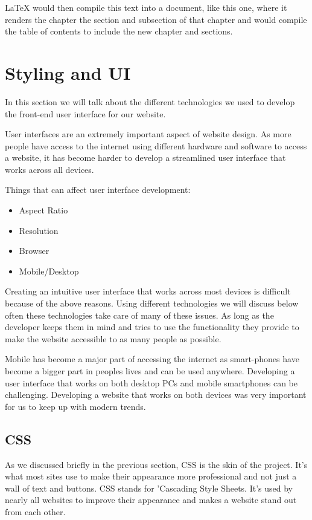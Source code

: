 LaTeX would then compile this text into a document, like this one, where it renders the chapter the section and subsection of that chapter and would compile the table of contents to include the new chapter and sections.

\section{Styling and UI}
In this section we will talk about the different technologies we used to develop the front-end user interface for our website. 

User interfaces are an extremely important aspect of website design. As more people have access to the internet using different hardware and software to access a website, it has become harder to develop a streamlined user interface that works across all devices. 

Things that can affect user interface development:
\begin{itemize}
    \item Aspect Ratio
    \item Resolution
    \item Browser
    \item Mobile/Desktop
\end{itemize}

Creating an intuitive user interface that works across most devices is difficult because of the above reasons. Using different technologies we will discuss below often these technologies take care of many of these issues. As long as the developer keeps them in mind and tries to use the functionality they provide to make the website accessible to as many people as possible.

Mobile has become a major part of accessing the internet as smart-phones have become a bigger part in peoples lives and can be used anywhere. Developing a user interface that works on both desktop PCs and mobile smartphones can be challenging. Developing a website that works on both devices was very important for us to keep up with modern trends.

\subsection{CSS}
As we discussed briefly in the previous section, CSS is the skin of the project. It's what most sites use to make their appearance more professional and not just a wall of text and buttons. CSS stands for 'Cascading Style Sheets. It's used by nearly all websites to improve their appearance and makes a website stand out from each other.

